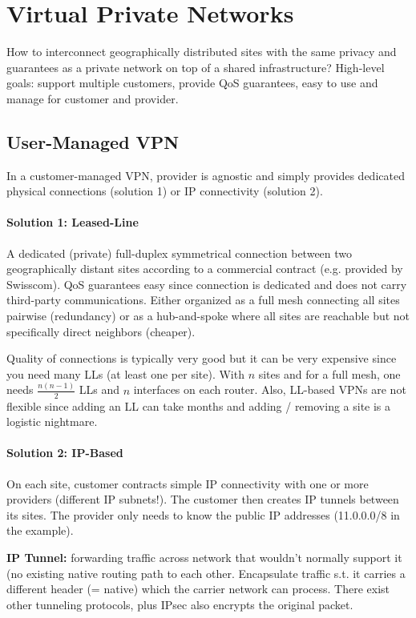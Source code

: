 \section{Virtual Private Networks}

How to interconnect geographically distributed sites with the same privacy and guarantees as a private network on top of a shared infrastructure? High-level goals: support multiple customers, provide QoS guarantees, easy to use and manage for customer and provider.

\subsection{User-Managed VPN}

In a customer-managed VPN, provider is agnostic and simply provides dedicated physical connections (solution 1) or IP connectivity (solution 2).

\paragraph{Solution 1: Leased-Line}
A dedicated (private) full-duplex symmetrical connection between two geographically distant sites according to a commercial contract (e.g. provided by Swisscom). QoS guarantees easy since connection is dedicated and does not carry third-party communications. Either organized as a full mesh connecting all sites pairwise (redundancy) or as a hub-and-spoke where all sites are reachable but not specifically direct neighbors (cheaper).

Quality of connections is typically very good but it can be very expensive since you need many LLs (at least one per site). With $n$ sites and for a full mesh, one needs $\frac{n(n-1)}{2}$ LLs and $n$ interfaces on each router. Also, LL-based VPNs are not flexible since adding an LL can take months and adding / removing a site is a logistic nightmare.

\paragraph{Solution 2: IP-Based}
On each site, customer contracts simple IP connectivity with one or more providers (different IP subnets!). The customer then creates IP tunnels between its sites. The provider only needs to know the public IP addresses (11.0.0.0/8 in the example).

\textbf{IP Tunnel:} forwarding traffic across network that wouldn't normally support it (no existing native routing path to each other. Encapsulate traffic s.t. it carries a different header (= native) which the carrier network can process. There exist other tunneling protocols, plus IPsec also encrypts the original packet.

